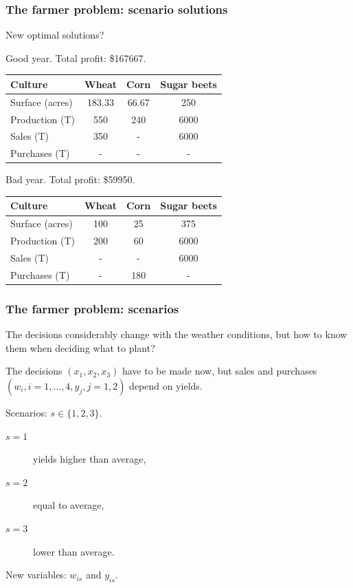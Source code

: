 \documentclass[aspectratio=169]{beamer}
\def\blue{\color{blue}}
\def\red{\color{red}}
\begin{document}
\begin{frame}
\frametitle{The farmer problem: scenario solutions}

{\blue New optimal solutions?}

{\red Good year}. Total profit: \$167667.
\begin{center}
\begin{tabular}{lccc}
\hline
Culture & Wheat & Corn & Sugar beets \\
\hline
Surface (acres) & 183.33 & 66.67 & 250 \\
Production (T) & 550 & 240 & 6000 \\
Sales (T) & 350 & - & 6000 \\
Purchases (T) & - & - & - \\
\hline
\end{tabular}
\end{center}

{\red Bad year}. Total profit: \$59950.
\begin{center}
\begin{tabular}{lccc}
\hline
Culture & Wheat & Corn & Sugar beets \\
\hline
Surface (acres) & 100 & 25 & 375 \\
Production (T) & 200 & 60 & 6000 \\
Sales (T) & - & - & 6000 \\
Purchases (T) & - & 180 & - \\
\hline
\end{tabular}
\end{center}

\end{frame}

\begin{frame}
\frametitle{The farmer problem: scenarios}

The decisions considerably change with the weather conditions, but how to know them when deciding what to plant?
\mbox{}

The decisions $(x_1, x_2, x_3)$ have to be made now, but sales and purchases $(w_i, i=1,\ldots,4, y_j, j=1,2)$ depend on yields.

\mbox{}

{\blue Scenarios}: $s \in \{1,2,3\}$.
\begin{description}
	\item[$s = 1$] yields higher than average,
	\item[$s = 2$] equal to average,
	\item[$s = 3$] lower than average.
\end{description}
New variables: $w_{is}$ and $y_{is}$.

\end{frame}
\end{document}
